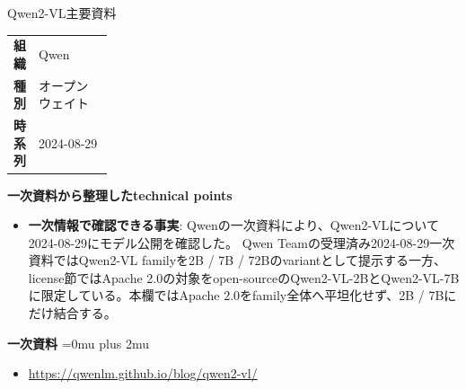 \begin{technicalnote}{Qwen2-VL}{主要資料}
\begingroup
\begin{tabularx}{\linewidth}{@{}>{\bfseries}p{0.22\linewidth}X@{}}
組織 & Qwen \\
種別 & オープンウェイト \\
時系列 & 2024-08-29 \\
\end{tabularx}
\smallskip
{\bfseries 一次資料から整理したtechnical points}
\begin{itemize}[leftmargin=1.5em,itemsep=0.35em]
\item \textbf{一次情報で確認できる事実}: Qwenの一次資料により、Qwen2-VLについて2024-08-29にモデル公開を確認した。 Qwen Teamの受理済み2024-08-29一次資料ではQwen2-VL familyを2B / 7B / 72Bのvariantとして提示する一方、license節ではApache 2.0の対象をopen-sourceのQwen2-VL-2BとQwen2-VL-7Bに限定している。本欄ではApache 2.0をfamily全体へ平坦化せず、2B / 7Bにだけ結合する。
\end{itemize}
\begin{minipage}{\linewidth}
\begin{samepage}
{\bfseries 一次資料}
\begingroup\sloppy
\Urlmuskip=0mu plus 2mu\relax
\begin{itemize}[leftmargin=1.5em,itemsep=0.25em]
\item {\scriptsize\url{https://qwenlm.github.io/blog/qwen2-vl/}}
\end{itemize}
\endgroup
\end{samepage}
\end{minipage}
\endgroup
\end{technicalnote}
\medskip

